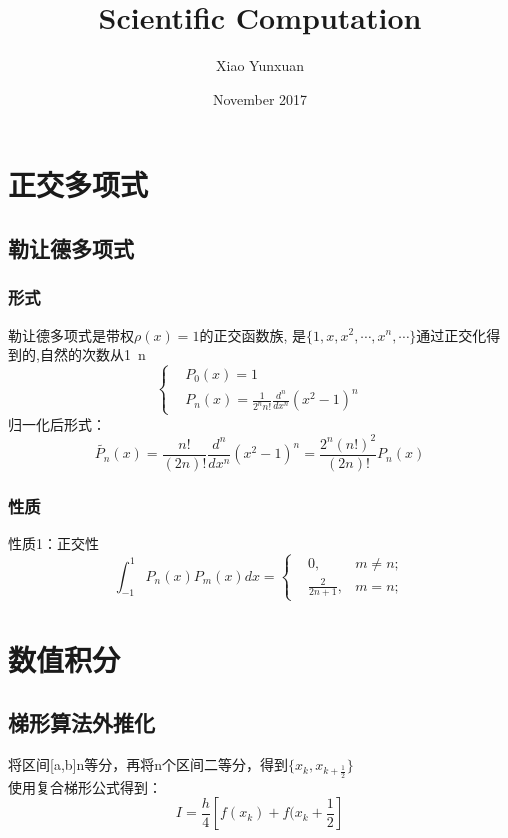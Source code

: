 \documentclass[12pt]{article}
\title{Scientific Computation}
\author{Xiao Yunxuan}
\date{November 2017}
\begin{document}
\begin{CJK*}{UTF8}{gbsn}
\begin{spacing}{1.5}
\maketitle
\newpage

\section{正交多项式}
    \subsection{勒让德多项式}
        \subsubsection{形式}
        勒让德多项式是带权$\rho(x) = 1$的正交函数族,          是$\{1,x,x^2,\cdots,x^n,\cdots \}$通过正交化得到的,自然的次数从1~n
        $$
        \left\{
            \begin{aligned}
               &P_0(x) = 1\\
               &P_n(x) = \frac{1}{2^n n!}\frac{d^n}{dx^n}(x^2 - 1)^n
            \end{aligned}
        \right.
        $$
        归一化后形式：\\
        $$\widetilde{P_n}(x) = \frac{n!}{(2n)!}\frac{d^n}{dx^n}(x^2 - 1)^n = \frac{2^n(n!)^2}{(2n)!}P_n(x)$$
        \subsubsection{性质}
        性质1：正交性
        $$
        \int_{-1}^{1} P_n(x)P_m(x)dx =
        \left \{
            \begin{aligned}
                &0,    &m\not=n; \\
                &\frac{2}{2n+1},  &m=n;
            \end{aligned}
        \right.
        $$

\section{数值积分}
    \subsection{梯形算法外推化}
        将区间[a,b]n等分，再将n个区间二等分，得到$\{x_k,x_{k +\frac{1}{2}}\}$ \\
        使用复合梯形公式得到：
        \[
            I = \frac{h}{4}[f(x_k) + f(x_k+\frac{1}{2}]
        \]


\end{spacing}
\end{CJK*}
\end{document}
